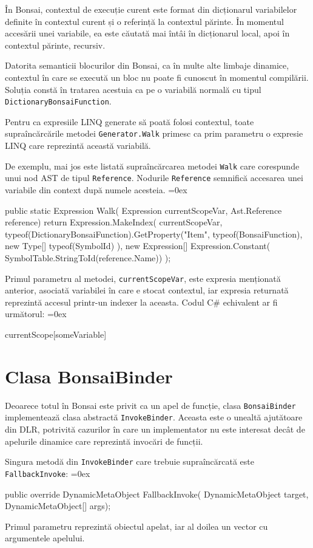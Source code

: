 \documentclass[12pt,a4paper]{memoir}
\renewcommand{\c}{\texttt}
\newenvironment{code}
{
\definecolor{shadecolor}{gray}{0.91}
\topsep=0ex
\relax
\shaded
\verbatim
}
{
\endverbatim
\endshaded
}
\begin{document}
În Bonsai, contextul de execuție curent este format din dicționarul variabilelor definite în contextul curent și o referință la contextul părinte. În momentul accesării unei variabile, ea este căutată mai întâi în dicționarul local, apoi în contextul părinte, recursiv.

Datorita semanticii blocurilor din Bonsai, ca în multe alte limbaje dinamice, contextul în care se execută un bloc nu poate fi cunoscut în momentul compilării. Soluția constă în tratarea acestuia ca pe o variabilă normală cu tipul \c{DictionaryBonsaiFunction}. 

Pentru ca expresiile LINQ generate să poată folosi contextul, toate supraîncărcările metodei \c{Generator.Walk} primesc ca prim parametru o expresie LINQ care reprezintă această variabilă.

De exemplu, mai jos este listată supraîncărcarea metodei \c{Walk} care corespunde unui nod AST de tipul \c{Reference}. Nodurile \c{Reference} semnifică accesarea unei variabile din context după numele acesteia. 
\begin{code}
public static Expression Walk(
    Expression currentScopeVar,
    Ast.Reference reference)
{
    return Expression.MakeIndex(
        currentScopeVar,
        typeof(DictionaryBonsaiFunction).GetProperty("Item", 
            typeof(BonsaiFunction), new Type[] { typeof(SymbolId) }), 
        new Expression[] { Expression.Constant(
            SymbolTable.StringToId(reference.Name)) });
}
\end{code}
Primul parametru al metodei, \c{currentScopeVar}, este expresia menționată anterior, asociată variabilei în care e stocat contextul, iar expresia returnată reprezintă accesul printr-un indexer la aceasta. Codul C\# echivalent ar fi următorul:
\begin{code}
currentScope[someVariable]
\end{code}

\section{Clasa BonsaiBinder}

Deoarece totul în Bonsai este privit ca un apel de funcție, clasa \c{BonsaiBinder} implementează clasa abstractă \c{InvokeBinder}. Aceasta este o unealtă ajutătoare din DLR, potrivită cazurilor în care un implementator nu este interesat decât de apelurile dinamice care reprezintă invocări de funcții. 

Singura metodă din \c{InvokeBinder} care trebuie supraîncărcată este\\ \c{FallbackInvoke}:
\begin{code}
public override DynamicMetaObject FallbackInvoke(
  DynamicMetaObject target,
  DynamicMetaObject[] args);
\end{code}
Primul parametru reprezintă obiectul apelat, iar al doilea un vector cu argumentele apelului.
\end{document}
